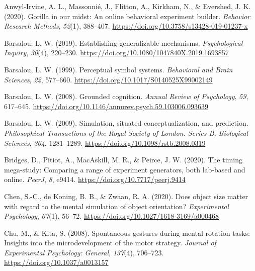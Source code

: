 \documentclass[
  man,floatsintext]{apa7}
\newlength{\cslhangindent}
\newlength{\cslentryspacingunit} %
\newenvironment{CSLReferences}[2] %
 {%
  \setlength{\parindent}{0pt}
  \ifodd #1
  \let\oldpar\par
  \def\par{\hangindent=\cslhangindent\oldpar}
  \fi
  \setlength{\parskip}{#2\cslentryspacingunit}
 }%
 {}
\begin{document}
\hypertarget{refs}{}
\begin{CSLReferences}{1}{0}
\leavevmode{}%
Anwyl-Irvine, A. L., Massonnié, J., Flitton, A., Kirkham, N., \& Evershed, J. K. (2020). Gorilla in our midst: {An} online behavioral experiment builder. \emph{Behavior Research Methods}, \emph{52}(1), 388--407. \url{https://doi.org/10.3758/s13428-019-01237-x}

\leavevmode{}%
Barsalou, L. W. (2019). Establishing generalizable mechanisms. \emph{Psychological Inquiry}, \emph{30}(4), 220--230. \url{https://doi.org/10.1080/1047840X.2019.1693857}

\leavevmode{}%
Barsalou, L. W. (1999). Perceptual symbol systems. \emph{Behavioral and Brain Sciences}, \emph{22}, 577--660. \url{https://doi.org/10.1017/S0140525X99002149}

\leavevmode{}%
Barsalou, L. W. (2008). Grounded cognition. \emph{Annual Review of Psychology}, \emph{59}, 617--645. \url{https://doi.org/10.1146/annurev.psych.59.103006.093639}

\leavevmode{}%
Barsalou, L. W. (2009). Simulation, situated conceptualization, and prediction. \emph{Philosophical Transactions of the Royal Society of London. Series B, Biological Sciences}, \emph{364}, 1281--1289. \url{https://doi.org/10.1098/rstb.2008.0319}

\leavevmode{}%
Bridges, D., Pitiot, A., MacAskill, M. R., \& Peirce, J. W. (2020). The timing mega-study: Comparing a range of experiment generators, both lab-based and online. \emph{PeerJ}, \emph{8}, e9414. \url{https://doi.org/10.7717/peerj.9414}

\leavevmode{}%
Chen, S.-C., de Koning, B. B., \& Zwaan, R. A. (2020). Does object size matter with regard to the mental simulation of object orientation? \emph{Experimental Psychology}, \emph{67}(1), 56--72. \url{https://doi.org/10.1027/1618-3169/a000468}

\leavevmode{}%
Chu, M., \& Kita, S. (2008). Spontaneous gestures during mental rotation tasks: {Insights} into the microdevelopment of the motor strategy. \emph{Journal of Experimental Psychology: General}, \emph{137}(4), 706--723. \url{https://doi.org/10.1037/a0013157}


\end{CSLReferences}
\end{document}
